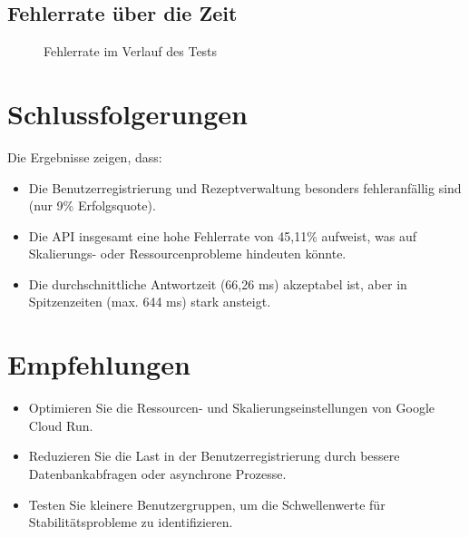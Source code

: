 \subsection*{Fehlerrate über die Zeit}
\begin{figure}
    \centering
    \caption{Fehlerrate im Verlauf des Tests}
    \label{fig:error_rate}
\end{figure}

\section*{Schlussfolgerungen}
Die Ergebnisse zeigen, dass:
\begin{itemize}
    \item Die Benutzerregistrierung und Rezeptverwaltung besonders fehleranfällig sind (nur 9\% Erfolgsquote).
    \item Die API insgesamt eine hohe Fehlerrate von 45,11\% aufweist, was auf Skalierungs- oder Ressourcenprobleme hindeuten könnte.
    \item Die durchschnittliche Antwortzeit (66,26 ms) akzeptabel ist, aber in Spitzenzeiten (max. 644 ms) stark ansteigt.
\end{itemize}

\section*{Empfehlungen}
\begin{itemize}
    \item Optimieren Sie die Ressourcen- und Skalierungseinstellungen von Google Cloud Run.
    \item Reduzieren Sie die Last in der Benutzerregistrierung durch bessere Datenbankabfragen oder asynchrone Prozesse.
    \item Testen Sie kleinere Benutzergruppen, um die Schwellenwerte für Stabilitätsprobleme zu identifizieren.
\end{itemize}